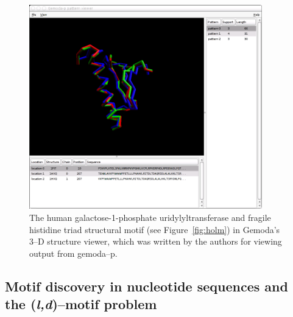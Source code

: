     \begin{figure}[ptb]
        \centering
        \includegraphics[width=0.90\textwidth]{Body/Images-chap3/galt-hit.png}
        \caption[Structural motif in Gemoda's 3--D structure viewer]{The
            human galactose-1-phosphate uridylyltransferase and
        fragile histidine triad structural motif (see Figure~\vref{fig:holm}) in Gemoda's 3--D structure viewer,
        which was written by the authors for viewing output from gemoda--p.
        }\label{fig:holmViewer}
    \end{figure}


    \subsection{Motif discovery in nucleotide sequences and the (\textit{l,d})--motif problem}



